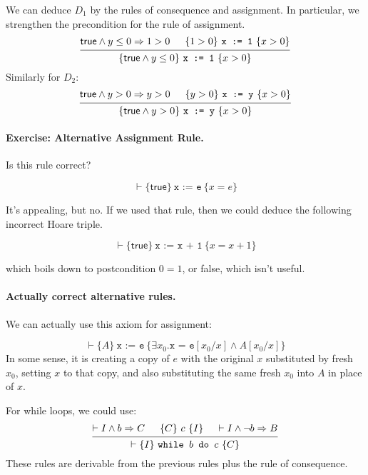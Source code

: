 \documentclass[11pt]{article}
\begin{document}
We can deduce $D_1$ by the rules of consequence and assignment. In particular, we strengthen the precondition
for the rule of assignment.
\[
\begin{prooftree}
  \hypo{\mathsf{true} \wedge y \leq 0 \Rightarrow 1 > 0}
  \hypo{\{ 1 > 0 \} ~ \texttt{x := 1} ~ \{ x > 0 \}}
  \infer2{\{ \mathsf{true} \wedge y \leq 0 \} ~ \texttt{x := 1} ~ \{ x > 0 \}}
\end{prooftree}
\]
Similarly for $D_2$:
\[
\begin{prooftree}
  \hypo{\mathsf{true} \wedge y > 0 \Rightarrow y > 0}
  \hypo{\{ y > 0 \} ~ \texttt{x := y} ~ \{ x > 0 \}}
  \infer2{\{ \mathsf{true} \wedge y > 0 \} ~ \texttt{x := y} ~ \{ x > 0 \}}
\end{prooftree}
\]

\paragraph{Exercise: Alternative Assignment Rule.} Is this rule correct?

\[ \vdash \{ \mathsf{true} \}~ \texttt{x := e} ~ \{ x = e \} \]

It's appealing, but no. If we used that rule, then we could deduce the following incorrect
Hoare triple.

\[ \vdash \{ \mathsf{true} \}~ \texttt{x := x + 1} ~ \{ x = x + 1 \} \]

which boils down to postcondition $0 = 1$, or \textsf{false}, which isn't useful.

\paragraph{Actually correct alternative rules.} We can actually use this axiom for assignment:

\[
\vdash \{ A \}~ \texttt{x := e} ~ \{ \exists x_0. \texttt{x = e}[x_0/x] \wedge A[x_0/x] \} \]
In some sense, it is creating a copy of $e$ with the original $x$ substituted by fresh $x_0$, setting $x$ to that copy, and
also substituting the same fresh $x_0$ into $A$ in place of $x$.

For while loops, we could use:
\[
\begin{prooftree}
\hypo{\vdash I \wedge b \Rightarrow C}
\hypo{\{ C \} ~c~ \{ I \}}
\hypo{\vdash I \wedge \neg b \Rightarrow B}
\infer3{\vdash \{I\} ~\texttt{while $b$ do $c$}~\{C\}}
\end{prooftree}
\]
These rules are derivable from the previous rules plus the rule of consequence.
\end{document}
